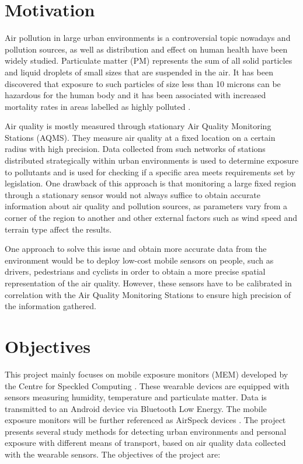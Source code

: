 \documentclass[bsc,frontabs,twoside,singlespacing, parskip,deptreport]{infthesis}     %
\begin{document}
\section{Motivation}

Air pollution in large urban environments is a controversial topic nowadays and pollution sources, as well as distribution and effect on human health have been widely studied. Particulate matter (PM) represents the sum of all solid particles and liquid droplets of small sizes that are suspended in the air. It has been discovered that exposure to such particles of size less than 10 microns can be hazardous for the human body and it has been associated with increased mortality rates in areas labelled as highly polluted \cite{Dockery1994}.

Air quality is mostly measured through stationary Air Quality Monitoring Stations (AQMS). They measure air quality at a fixed location on a certain radius with high precision. Data collected from such networks of stations distributed strategically within urban environments is used to determine exposure to pollutants and is used for checking if a specific area meets requirements set by legislation. One drawback of this approach is that monitoring a large fixed region through a stationary sensor would not always suffice to obtain accurate information about air quality and pollution sources, as parameters vary from a corner of the region to another and other external factors such as wind speed and terrain type affect the results.

One approach to solve this issue and obtain more accurate data from the environment would be to deploy low-cost mobile sensors on people, such as drivers, pedestrians and cyclists in order to obtain a more precise spatial representation of the air quality. However, these sensors have to be calibrated in correlation with the Air Quality Monitoring Stations to ensure high precision of the information gathered.

\section{Objectives}

This project mainly focuses on mobile exposure monitors (MEM) developed by the 
Centre for Speckled Computing \cite{speckled-computing}. These wearable devices are equipped with sensors measuring humidity, temperature and particulate matter. Data is transmitted to an Android device via Bluetooth Low Energy. The mobile exposure monitors will be further referenced as AirSpeck devices \cite{airspeck}. The project presents several study methods for detecting urban environments and personal exposure with different means of transport, based on air quality data collected with the wearable sensors. The objectives of the project are:
\end{document}
